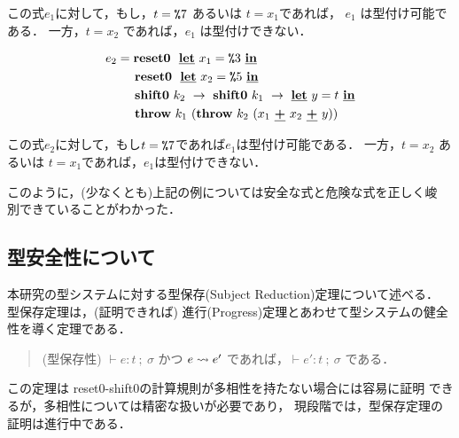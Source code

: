 この式$e_1$に対して，もし，$t=\texttt{\%}{7}$ あるいは $t=x_1$であれば，
$e_1$ は型付け可能である．
一方，$t=x_2$ であれば，$e_1$ は型付けできない．

\begin{align*}
  e_2 & = \textbf{reset0} ~~\underline{\textbf{let}}~x_1=\texttt{\%}{3}~\underline{\textbf{in}} \\
      & \phantom{=}~~ \textbf{reset0} ~~\underline{\textbf{let}}~x_2=\texttt{\%}{5}~\underline{\textbf{in}} \\
      & \phantom{=}~~ \textbf{shift0}~k_2~\to~ \textbf{shift0}~k_1~\to~ \underline{\textbf{let}}~y=t~\underline{\textbf{in}} \\
      & \phantom{=}~~ \textbf{throw}~k_1~(\textbf{throw}~k_2~(x_1~\underline{\textbf{+}}~x_2~\underline{\textbf{+}}~y))
\end{align*}

この式$e_2$に対して，もし$t=\texttt{\%}{7}$であれば$e_1$は型付け可能である．
一方，$t=x_2$ あるいは $t=x_1$であれば，$e_1$は型付けできない．

このように，(少なくとも)上記の例については安全な式と危険な式を正しく峻
別できていることがわかった．

\subsection{型安全性について}

本研究の型システムに対する型保存(Subject Reduction)定理について述べる．
型保存定理は，(証明できれば)
進行(Progress)定理とあわせて型システムの健全性を導く定理である．

\begin{quote}
(型保存性)
$\vdash e:t~;~\sigma$ かつ $e \leadsto e'$ であれば，$\vdash e':t~;~\sigma$
である．
\end{quote}

この定理は reset0-shift0の計算規則が多相性を持たない場合には容易に証明
できるが，多相性については精密な扱いが必要であり，
現段階では，型保存定理の証明は進行中である．

